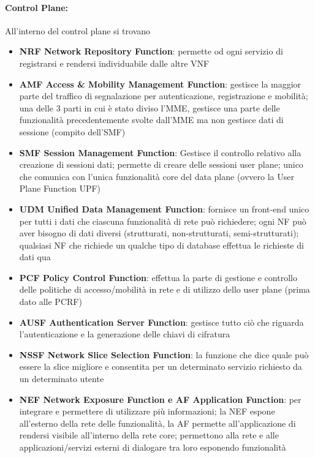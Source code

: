 \paragraph{Control Plane: } All'interno del control plane si trovano
\begin{itemize}
	\item \textbf{NRF Network Repository Function}: permette od ogni servizio di registrarsi e rendersi individuabile dalle altre VNF
	
	\item \textbf{AMF Access \& Mobility Management Function}: gestisce la maggior parte del traffico di segnalazione per autenticazione, registrazione e mobilità; una delle 3 parti in cui è stato diviso l'MME, gestisce una parte delle funzionalità precedentemente svolte dall'MME ma non gestisce dati di sessione (compito dell'SMF)
	
	\item \textbf{SMF Session Management Function}: Gestisce il controllo relativo alla creazione di sessioni dati; permette di creare delle sessioni user plane; unico che comunica con l'unica funzionalità core del data plane (ovvero la User Plane Function UPF)
	
	\item \textbf{UDM Unified Data Management Function}: fornisce un front-end unico per tutti i dati che ciascuna funzionalità di rete può richiedere; ogni NF può aver bisogno di dati diversi (strutturati, non-strutturati, semi-strutturati); qualsiasi NF che richiede un qualche tipo di database effettua le richieste di dati qua
	
	\item \textbf{PCF Policy Control Function}: effettua la parte di gestione e controllo delle politiche di accesso/mobilità in rete e di utilizzo dello user plane (prima dato alle PCRF)
	
	\item \textbf{AUSF Authentication Server Function}: gestisce tutto ciò che riguarda l'autenticazione e la generazione delle chiavi di cifratura
	
	\item \textbf{NSSF Network Slice Selection Function}: la funzione che dice quale può essere la slice migliore e consentita per un determinato servizio richiesto da un determinato utente
	
	\item \textbf{NEF Network Exposure Function e AF Application Function}: per integrare e permettere di utilizzare più informazioni; la NEF espone all'esterno della rete delle funzionalità, la AF permette all'applicazione di rendersi visibile all'interno della rete core; permettono alla rete e alle applicazioni/servizi esterni di dialogare tra loro esponendo funzionalità
\end{itemize}


